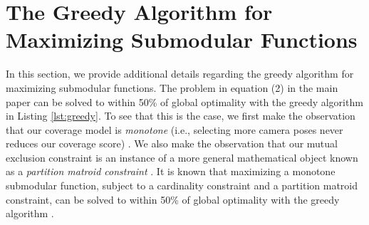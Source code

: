 \begin{Listing}[t]
\begin{algorithmic}[1]




    \ENDWHILE



    
    \ENDFOR

\ENDFOR


\end{algorithmic}
\end{Listing}

\vspace{-0pt}
\section{The Greedy Algorithm for Maximizing Submodular Functions}
\label{sec:greedy}

In this section, we provide additional details regarding the greedy algorithm for maximizing submodular functions.
The problem in equation (2) in the main paper can be solved to within 50\% of global optimality with the greedy algorithm in Listing \ref{lst:greedy}.
To see that this is the case, we first make the observation that our coverage model is \emph{monotone} (i.e., selecting more camera poses never reduces our coverage score) \cite{krause:2014}.
We also make the observation that our mutual exclusion constraint is an instance of a more general mathematical object known as a \emph{partition matroid constraint} \cite{krause:2014}.
It is known that maximizing a monotone submodular function, subject to a cardinality constraint and a partition matroid constraint, can be solved to within 50\% of global optimality with the greedy algorithm \cite{krause:2014}.

